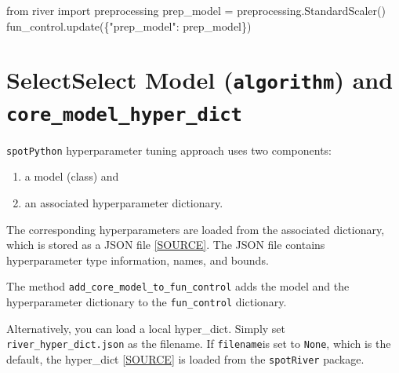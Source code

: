 \documentclass[
  letterpaper,
  DIV=11,
  numbers=noendperiod]{scrreprt}
\newenvironment{Shaded}{\begin{snugshade}}{\end{snugshade}}
\newcommand{\ImportTok}[1]{\textcolor[rgb]{0.00,0.46,0.62}{#1}}
\newcommand{\NormalTok}[1]{\textcolor[rgb]{0.00,0.23,0.31}{#1}}
\newcommand{\OperatorTok}[1]{\textcolor[rgb]{0.37,0.37,0.37}{#1}}
\newcommand{\StringTok}[1]{\textcolor[rgb]{0.13,0.47,0.30}{#1}}
\providecommand{\tightlist}{%
  \setlength{\itemsep}{0pt}\setlength{\parskip}{0pt}}\usepackage{longtable,booktabs,array}
\begin{document}
\begin{Shaded}
\begin{Highlighting}[]
\ImportTok{from}\NormalTok{ river }\ImportTok{import}\NormalTok{ preprocessing}
\NormalTok{prep\_model }\OperatorTok{=}\NormalTok{ preprocessing.StandardScaler()}
\NormalTok{fun\_control.update(\{}\StringTok{"prep\_model"}\NormalTok{: prep\_model\})}
\end{Highlighting}
\end{Shaded}

\hypertarget{selectselect-model-algorithm-and-core_model_hyper_dict-1}{%
\section{\texorpdfstring{SelectSelect Model (\texttt{algorithm}) and
\texttt{core\_model\_hyper\_dict}}{SelectSelect Model (algorithm) and core\_model\_hyper\_dict}}\label{selectselect-model-algorithm-and-core_model_hyper_dict-1}}

\texttt{spotPython} hyperparameter tuning approach uses two components:

\begin{enumerate}
\def\labelenumi{\arabic{enumi}.}
\tightlist
\item
  a model (class) and
\item
  an associated hyperparameter dictionary.
\end{enumerate}

The corresponding hyperparameters are loaded from the associated
dictionary, which is stored as a JSON file
\href{https://github.com/sequential-parameter-optimization/spotRiver/blob/main/src/spotRiver/data/river_hyper_dict.json}{{[}SOURCE{]}}.
The JSON file contains hyperparameter type information, names, and
bounds.

The method \texttt{add\_core\_model\_to\_fun\_control} adds the model
and the hyperparameter dictionary to the \texttt{fun\_control}
dictionary.

Alternatively, you can load a local hyper\_dict. Simply set
\texttt{river\_hyper\_dict.json} as the filename. If \texttt{filename}is
set to \texttt{None}, which is the default, the hyper\_dict
\href{https://github.com/sequential-parameter-optimization/spotRiver/blob/main/src/spotRiver/data/river_hyper_dict.json}{{[}SOURCE{]}}
is loaded from the \texttt{spotRiver} package.
\end{document}
